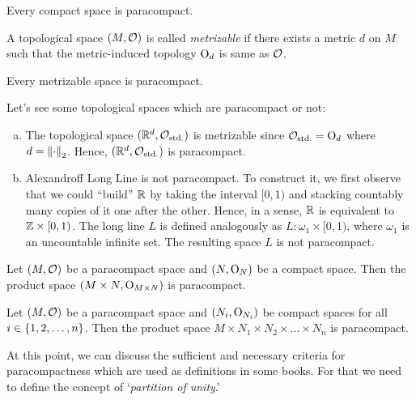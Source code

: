 \begin{corollary}
	Every compact space is paracompact.
\end{corollary}

\begin{definition}
	A topological space \((M, \mathcal{O})\) is called \emph{metrizable} if there exists a metric \(d\) on \(M\) such that the metric-induced topology \(\mathrm{O}_d\) is same as \(\mathcal{O}\).
\end{definition}

\begin{theorem}\label{thm:stone}
	Every metrizable space is paracompact.
\end{theorem}

\begin{example}
	Let's see some topological spaces which are paracompact or not:
	\begin{enumerate}[(a)]
		\item The topological space \((\mathbb R^d, \mathcal{O}_{\text{std.}})\) is metrizable since \(\mathcal{O}_{\text{std.}} = \mathrm{O}_d\) where \(d = \norm{\cdot}_2\). Hence, \((\mathbb R^d, \mathcal{O}_{\text{std.}})\) is paracompact.
		\item Alexandroff Long Line is not paracompact. To construct it, we first observe that we could ``build'' \(\mathbb R\) by taking the interval \([0,1)\) and stacking countably many copies of it one after the other. Hence, in a sense, \(\mathbb R\) is equivalent to \(\mathbb Z \times [0,1)\). The long line \(L\) is defined analogously as \(L: \omega_1 \times [0,1)\), where \(\omega_1\) is an uncountable infinite set. The resulting space \(L\) is not paracompact.
	\end{enumerate}
\end{example}

\begin{theorem}
	Let \((M, \mathcal{O})\) be a paracompact space and \((N, \mathrm{O}_N)\) be a compact space. Then the product space \((M \times N, \mathrm{O}_{M \times N})\) is paracompact.
\end{theorem}

\begin{corollary}
	Let \((M, \mathcal{O})\) be a paracompact space and \((N_i, \mathrm{O}_{N_i})\) be compact spaces for all \(i \in \qty{1, 2, \ldots, n}\). Then the product space \(M \times N_1 \times N_2 \times \ldots \times N_n\) is paracompact.
\end{corollary}

At this point, we can discuss the sufficient and necessary criteria for paracompactness which are used as definitions in some books. For that we need to define the concept of `\emph{partition of unity}.'


